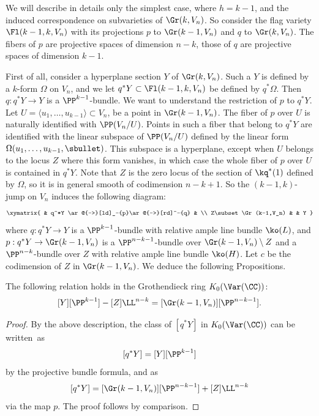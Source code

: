 We will describe in details only the simplest case, where $h=k-1$, and the induced correspondence
on subvarieties of $\Gr(k,V_n)$. So consider
the flag variety $\Fl(k-1,k,V_n)$ with its projections $p$ to $\Gr(k-1,V_n)$ and $q$
to $\Gr(k,V_n)$. The fibers of $p$ are projective spaces of dimension $n-k$, those of
$q$ are projective spaces of dimension $k-1$.

First of all, consider a hyperplane section $Y$ of $\Gr(k,V_n)$. Such a $Y$ is defined
by a $k$-form $\Omega$ on $V_n$, and we let $q^* Y \subset \Fl(k-1,k,V_n)$ be defined by $q^*\Omega$.
Then $q : q^* Y \to Y$ is a $\PP^{k-1}$-bundle. We want to understand the restriction of $p$ to $q^*Y$.
Let $U=\langle u_1,\ldots, u_{k-1}\rangle \subset V_n$, be a point in $\Gr(k-1,V_n)$. The fiber of $p$ over $U$ is naturally identified with $\PP(V_n/U)$. Points in such a fiber that belong to $q^*Y$ are identified with the linear subspace of $\PP(V_n/U)$
defined by the linear form $\Omega (u_1,\ldots, u_{k-1}, \sbullet)$. This subspace is a hyperplane,
except when $U$ belongs to the locus $Z$ where this form vanishes, in which case the whole
fiber of $p$ over $U$ is contained in $q^*Y$. Note that $Z$ is the zero locus of the section
of $\kq^*(1)$ defined by $\Omega$, so it is in general smooth of codimension $n-k+1$.
So the $(k-1,k)$-jump on $V_n$ induces the following diagram:
\[
\xymatrix{
& q^*Y \ar@{->}[ld]_-{p}\ar@{->}[rd]^-{q} & \\
Z\subset \Gr(k-1,V_n) & & Y
}
\]
where $q: q^*Y \to Y$ is a $\PP^{k-1}$-bundle with relative ample line bundle $\ko(L)$, and
$p: q^* Y \to \Gr(k-1,V_n)$ is a
$\PP^{n-k-1}$-bundle over $\Gr(k-1,V_n)\setminus Z$ and a $\PP^{n-k}$-bundle
over $Z$ with relative ample line bundle $\ko(H)$. Let $c$ be the codimension of $Z$ in $\Gr(k-1,V_n)$.
We deduce the following Propositions.

\begin{prop}\label{prop:K0-jump}
The following relation holds in the Grothendieck ring $K_0(\Var(\CC))$:%
\begin{equation*}\label{eq:rel-in-K0-jump}
[Y][\PP^{k-1}]-[Z]\LL^{n-k}=[\Gr(k-1,V_n)][\PP^{n-k-1}].
\end{equation*}
\end{prop}

\begin{proof}
By the above description, the class of $[q^*Y]$ in $K_0(\Var(\CC))$ can be written~as%
\begin{equation}\label{eq:jumping-diagram-Hsection}
[q^*Y]=[Y][\PP^{k-1}]
\end{equation}
by the projective bundle formula, and as
\[
[q^*Y]=[\Gr(k-1,V_n)][\PP^{n-k-1}] + [Z]\LL^{n-k}
\]
via the map $p$. The proof follows by comparison.
\end{proof}

